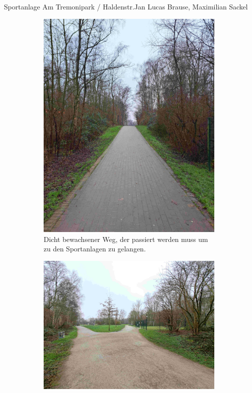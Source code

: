 \documentclass{../../templates/amendment}
\begin{document}
\begin{boxed}{Sportanlage Am Tremonipark / Haldenstr.}{Jan Lucas Brause, Maximilian Sackel}
    \begin{figure}[htpb]
        \centering
        \begin{subfigure}[t]{0.3\textwidth}
            \begin{center}
                \includegraphics[width=\linewidth]{pictures/photo1.jpg}
                \caption{Dicht bewachsener Weg, der passiert werden muss um zu den Sportanlagen zu gelangen.}
            \end{center}
        \end{subfigure}
        \begin{subfigure}[t]{0.5\textwidth}
            \begin{center}
                \includegraphics[width=\linewidth]{pictures/photo5.jpg}

\end{center}
\end{subfigure}
\end{figure}
\end{boxed}
\end{document}
